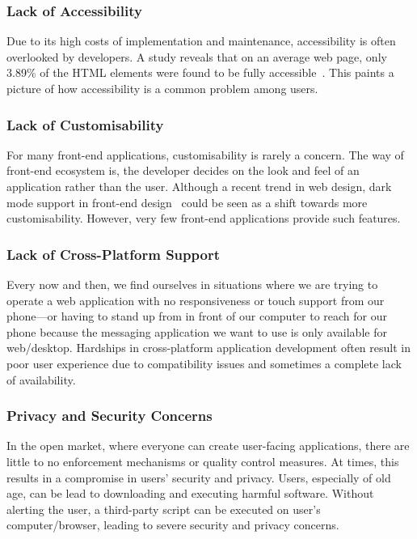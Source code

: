 \subsubsection{Lack of Accessibility}
Due to its high costs of implementation and maintenance, accessibility is often overlooked by developers. A study reveals that on an average web page, only 3.89\% of the HTML elements were found to be fully accessible~\cite{WebNotForAll}. This paints a picture of how accessibility is a common problem among users.

\subsubsection{Lack of Customisability}
For many front-end applications, customisability is rarely a concern. The way of front-end ecosystem is, the developer decides on the look and feel of an application rather than the user. Although a recent trend in web design, dark mode support in front-end design~\cite{DarkMode} could be seen as a shift towards more customisability. However, very few front-end applications provide such features.

\subsubsection{Lack of Cross-Platform Support}
Every now and then, we find ourselves in situations where we are trying to operate a web application with no responsiveness or touch support from our phone—or having to stand up from in front of our computer to reach for our phone because the messaging application we want to use is only available for web/desktop. Hardships in cross-platform application development often result in poor user experience due to compatibility issues and sometimes a complete lack of availability.

\subsubsection{Privacy and Security Concerns}
In the open market, where everyone can create user-facing applications, there are little to no enforcement mechanisms or quality control measures. At times, this results in a compromise in users' security and privacy. Users, especially of old age, can be lead to downloading and executing harmful software. Without alerting the user, a third-party script can be executed on user's computer/browser, leading to severe security and privacy concerns. 


